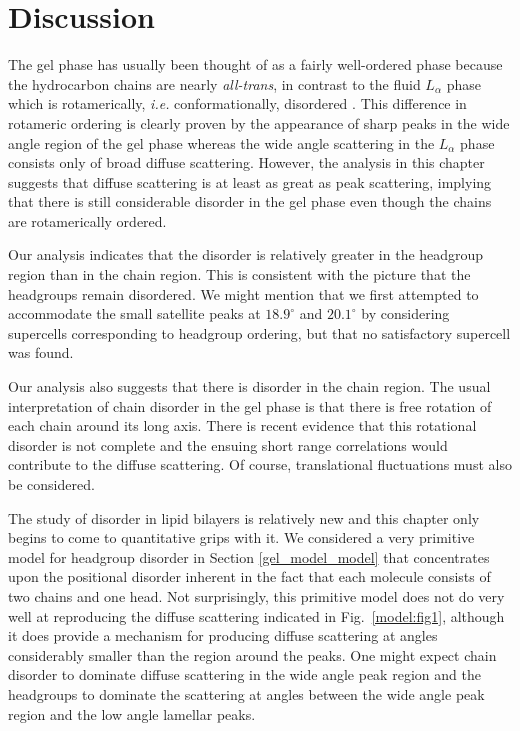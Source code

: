 \section{Discussion}
\label{gel_model_dis}

The gel phase has usually been thought of as a fairly well-ordered
phase because the hydrocarbon chains are nearly {\em all-trans}, in
contrast to the fluid $L_{\alpha}$ phase which is rotamerically,
{\em i.e.} conformationally, 
disordered \cite{Nag80}.  This difference in rotameric ordering
is clearly proven by the appearance
of sharp peaks in the wide angle region of the gel phase whereas the
wide angle scattering in the $L_{\alpha}$ phase consists only of broad
diffuse scattering.  However, the analysis in this chapter suggests that
diffuse scattering is at least as great as peak scattering,
implying that there is still considerable
disorder in the gel phase even though the chains are rotamerically ordered.  

Our analysis indicates that the disorder is relatively greater in the
headgroup region than in the chain region.  This is consistent with
the picture that the headgroups remain disordered.  We might mention
that we first attempted to accommodate the small satellite peaks at
$18.9^{\circ}$ and $20.1^{\circ}$ by considering supercells corresponding to
headgroup ordering, but that no satisfactory supercell was found.

Our analysis also suggests that there is disorder in the chain region. 
The usual interpretation of chain disorder in the gel phase is 
that there is free rotation of 
each chain around its long axis.  There is recent evidence that this
rotational disorder is not complete \cite{Nag93a} and the ensuing
short range correlations would contribute to the diffuse scattering.
Of course, translational fluctuations must also be considered.

The study of disorder in lipid bilayers is relatively new and this chapter
only begins to come to quantitative grips with it.  We considered
a very primitive model for headgroup disorder in Section \ref{gel_model_model} 
that
concentrates upon the positional disorder inherent in the fact that
each molecule consists of two chains and one head.  Not surprisingly,
this primitive model does not do very well at reproducing the diffuse
scattering indicated in Fig.\ \ref{model:fig1}, although it does provide a 
mechanism for
producing diffuse scattering at angles considerably smaller than
the region around the peaks.  One might expect chain disorder to dominate
diffuse scattering in the wide angle peak region and
the headgroups to dominate the scattering at angles between the
wide angle peak region and the low angle lamellar peaks.

